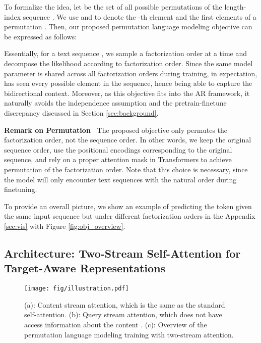 \documentclass{article}
\begin{document}
To formalize the idea, let  be the set of all possible permutations of the length- index sequence .
We use  and  to denote the -th element and the first  elements of a permutation .
Then, our proposed permutation language modeling objective can be expressed as follows:

Essentially, for a text sequence , we sample a factorization order  at a time and decompose the likelihood  according to factorization order.
Since the same model parameter  is shared across all factorization orders during training, in expectation,  has seen every possible element  in the sequence, hence being able to capture the bidirectional context. Moreover, as this objective fits into the AR framework, it naturally avoids the independence assumption and the pretrain-finetune discrepancy discussed in Section \ref{sec:background}.


\textbf{Remark on Permutation~}
The proposed objective only permutes the factorization order, not the sequence order. 
In other words, we keep the original sequence order, use the positional encodings corresponding to the original sequence, and rely on a proper attention mask in Transformers to achieve permutation of the factorization order.
Note that this choice is necessary, since the model will only encounter text sequences with the natural order during finetuning.

To provide an overall picture, we show an example of predicting the token  given the same input sequence  but under different factorization orders in the Appendix \ref{sec:vis} with Figure \ref{fig:obj_overview}.









\subsection{Architecture: Two-Stream Self-Attention for Target-Aware Representations}
\begin{figure}[!h]
	\centering
	\texttt{[image: fig/illustration.pdf]}
	\caption{(a): Content stream attention, which is the same as the standard self-attention. (b): Query stream attention, which does not have access information about the content . (c): Overview of the permutation language modeling training with two-stream attention.}
	\label{fig:plm}
	\vspace{-1em}
\end{figure}
\end{document}
